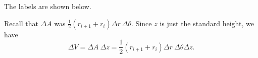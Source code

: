 \begin{smallhint}

\end{smallhint}
\begin{bighint}

\end{bighint}
\begin{activitySolution}
    \ba
    \item The labels are shown below. 
\begin{center}
\end{center}

    \item Recall that $\Delta A$ was $\frac{1}{2}(r_{i+1}+r_i) \Delta r \ \Delta \theta$. Since $z$ is just the standard height, we have 
\[\Delta V = \Delta A \ \Delta z = \frac{1}{2}(r_{i+1}+r_i) \Delta r \ \Delta \theta \Delta z.\]

    \ea
\end{activitySolution}
\aftera

